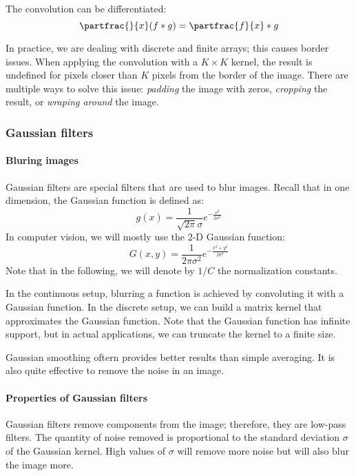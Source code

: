 The convolution can be differentiated:
\begin{equation}
    \label{eq:diff-conv}
    \partfrac{}{x}(f*g) = \partfrac{f}{x}*g
\end{equation}

In practice, we are dealing with discrete and finite arrays; this causes border issues. When applying the convolution with a $K\times K$ kernel, the result is undefined for pixels closer than $K$ pixels from the border of the image. There are multiple ways to solve this issue: \emph{padding} the image with zeros, \emph{cropping} the result, or \emph{wraping around} the image.

\subsubsection{Gaussian filters}
\paragraph*{Bluring images}
Gaussian filters are special filters that are used to blur images. Recall that in one dimension, the Gaussian function is defined as:
\begin{equation*}
    g(x) = \frac{1}{\sqrt{2\pi}\sigma}e^{-\frac{x^2}{2\sigma^2}}
\end{equation*}
In computer vision, we will mostly use the 2-D Gaussian function:
\begin{equation*}
    G(x, y) = \frac{1}{2\pi\sigma^2}e^{-\frac{x^2+y^2}{2\sigma^2}}
\end{equation*}
Note that in the following, we will denote by $1/C$ the normalization constants.

In the continuous setup, blurring a function is achieved by convoluting it with a Gaussian function. In the discrete setup, we can build a matrix kernel that approximates the Gaussian function. Note that the Gaussian function has infinite support, but in actual applications, we can truncate the kernel to a finite size.

Gaussian smoothing oftern provides better results than simple averaging. It is also quite effective to remove the noise in an image. 

\paragraph*{Properties of Gaussian filters}
Gaussian filters remove  components from the image; therefore, they are low-pass filters. The quantity of noise removed is proportional to the standard deviation $\sigma$ of the Gaussian kernel. High values of $\sigma$ will remove more noise but will also blur the image more.

